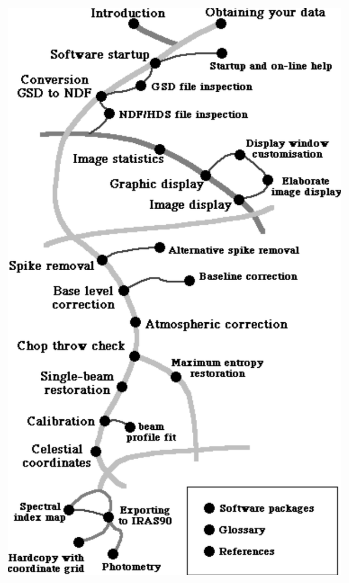 \documentclass[11pt]{article}
\newenvironment{latexonly}{}{}
\begin{document}
\begin{latexonly}
\begin{center}
\leavevmode\includegraphics[height=150mm]{sc1_cont}
\end{center}
\end{latexonly}
\end{document}
